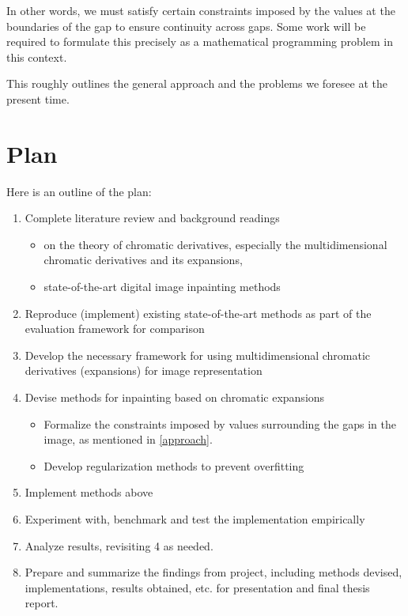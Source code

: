 \documentclass[11pt,oneside]{book}
\theoremstyle{plain}
\theoremstyle{definition}
\theoremstyle{remark}
\begin{document}
In other words, we must satisfy certain constraints imposed by the values
at the boundaries of the gap to ensure continuity across gaps.
Some work will be required to formulate this precisely as a 
mathematical programming problem in this context.

This roughly outlines the general approach and the problems we foresee at
the present time.

\section{Plan} 

Here is an outline of the plan:

\begin{enumerate}
\item Complete literature review and background readings 
  \begin{itemize}
    \item on the theory of chromatic derivatives, especially the 
    multidimensional chromatic derivatives and its expansions,
    \item state-of-the-art digital image inpainting methods
  \end{itemize}
\item Reproduce (implement) existing state-of-the-art methods
  as part of the evaluation framework for comparison
\item Develop the necessary framework for using multidimensional 
  chromatic derivatives (expansions) for image representation
\item Devise methods for inpainting based on chromatic expansions
\begin{itemize}
  \item Formalize the constraints imposed by values surrounding the gaps
  in the image, as mentioned in \cref{approach}.
  \item Develop regularization methods to prevent overfitting
\end{itemize} 
\item Implement methods above
\item Experiment with, benchmark and test the implementation empirically
\item Analyze results, revisiting 4 as needed.
\item Prepare and summarize the findings from project,
  including methods devised, implementations, results obtained, etc.
  for presentation and final thesis report.
\end{enumerate}
\end{document}

